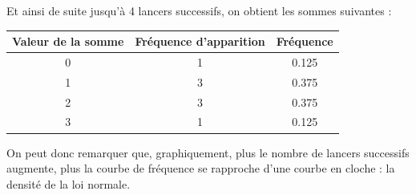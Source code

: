Et ainsi de suite jusqu'à 4 lancers successifs, on obtient les sommes suivantes : 

\begin{center}
    \begin{tabular}{c|c|c}
        \textbf{Valeur de la somme} & \textbf{Fréquence d'apparition} & \textbf{Fréquence} \\
        \hline 
        0 & 1 & 0.125 \\ 
        1 & 3 & 0.375 \\ 
        2 & 3 & 0.375 \\ 
        3 & 1 & 0.125 \\ 
    \end{tabular}
\end{center}

On peut donc remarquer que, graphiquement, plus le nombre de lancers successifs augmente, plus la courbe 
de fréquence se rapproche d'une courbe en cloche : la densité de la loi normale. 

